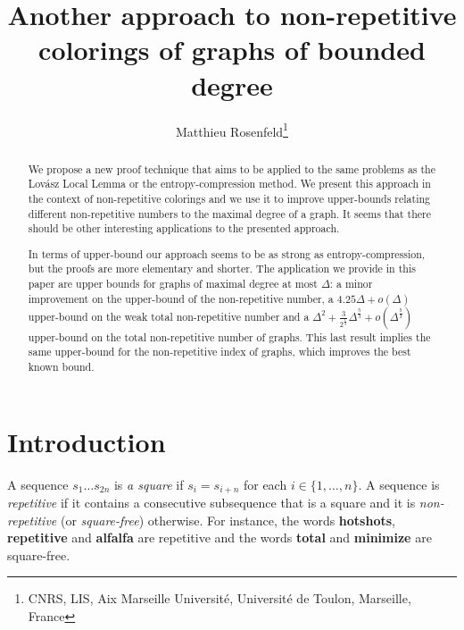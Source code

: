 \documentclass[a4paper,10pt]{article}
\title{Another approach to non-repetitive colorings of graphs of bounded degree}
\author{Matthieu Rosenfeld\footnote{CNRS, LIS, Aix Marseille Universit\'e, Universit\'e de Toulon, Marseille, France}}
\date{}
\begin{document}
\maketitle
\begin{abstract}
 We propose a new proof technique that aims to be applied to the same problems as the  Lov\'asz Local Lemma or the entropy-compression method.
 We present this approach in the context of non-repetitive colorings and we use it to improve upper-bounds relating different non-repetitive numbers to the maximal degree of a graph.
It seems that there should be other interesting applications to the presented approach.
 
 In terms of upper-bound our approach seems to be  as strong as entropy-compression, but the proofs are more elementary and shorter.
 The application we provide in this paper are upper bounds for graphs of maximal degree at most $\Delta$: a minor improvement on the upper-bound of the non-repetitive number,
 a $4.25\Delta +o(\Delta)$ upper-bound on the weak total non-repetitive number and
 a $ \Delta^2+\frac{3}{2^\frac{1}{3}}\Delta^{\frac{5}{3}}+ o(\Delta^{\frac{5}{3}})$ upper-bound on the total non-repetitive number of graphs.
 This last result implies the same upper-bound for the non-repetitive index of graphs, which improves the best known bound. 
 
 
\end{abstract}

\section{Introduction}
A sequence $s_1\ldots s_{2n}$ is \emph{a square} if
$s_i=s_{i+n}$  for each $i\in\{1,\ldots,n\}$.
A sequence is \emph{repetitive} if it contains a consecutive subsequence that is a square 
and it is \emph{non-repetitive} (or \emph{square-free}) otherwise. 
For instance, the words \textbf{hotshots}, \textbf{repetitive} and \textbf{alfalfa} are repetitive and
the words \textbf{total} and \textbf{minimize} are square-free.
\end{document}
